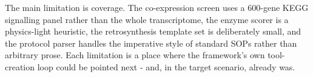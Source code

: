 The main limitation is coverage. The co-expression screen uses a 600-gene KEGG signalling panel rather than the whole transcriptome, the enzyme scorer is a physics-light heuristic, the retrosynthesis template set is deliberately small, and the protocol parser handles the imperative style of standard SOPs rather than arbitrary prose. Each limitation is a place where the framework's own tool-creation loop could be pointed next - and, in the target scenario, already was.

